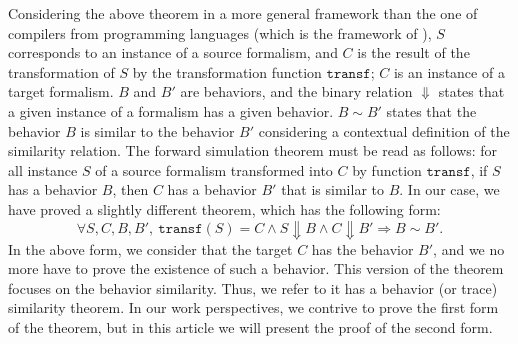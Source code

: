 \documentclass[pdflatex,sn-mathphys]{sn-jnl}%
\theoremstyle{thmstyleone}%
\theoremstyle{thmstyletwo}%
\theoremstyle{thmstylethree}%
\begin{document}
Considering the above theorem in a more general framework than the one
of compilers from programming languages (which is the framework of
\cite{Leroy2009}), $S$ corresponds to an instance of a source
formalism, and $C$ is the result of the transformation of $S$ by the
transformation function $\mathtt{transf}$; $C$ is an instance of a
target formalism. $B$ and $B'$ are behaviors, and the binary relation
$\Downarrow$ states that a given instance of a formalism has a given
behavior. $B\sim{}B'$ states that the behavior $B$ is similar to the
behavior $B'$ considering a contextual definition of the similarity
relation. The forward simulation theorem must be read as follows: for
all instance $S$ of a source formalism transformed into $C$ by
function $\mathtt{transf}$, if $S$ has a behavior $B$, then $C$ has a
behavior $B'$ that is similar to $B$. In our case, we have proved a
slightly different theorem, which has the following form:
\begin{equation*}
  \forall{}S,C,B,B',~\mathtt{transf}(S)=C\land{}S\Downarrow{}B\land{}C\Downarrow{}B'\Rightarrow{}B\sim{}B'.
\end{equation*}
In the above form, we consider that the target $C$ has the behavior
$B'$, and we no more have to prove the existence of such a behavior.
This version of the theorem focuses on the behavior similarity. Thus,
we refer to it has a behavior (or trace) similarity theorem. In our
work perspectives, we contrive to prove the first form of the theorem,
but in this article we will present the proof of the second form.
\end{document}
